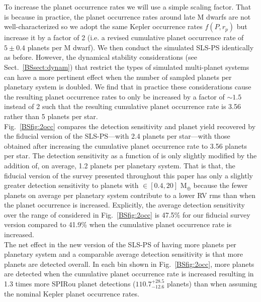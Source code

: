 To increase the planet occurrence rates we will use a simple scaling factor.
That is because in practice, the planet occurrence rates around late M dwarfs are not
well-characterized so we adopt the same Kepler occurrence rates $f(P,r_p)$
but increase it by a factor of 2 (i.e. a revised cumulative planet occurrence
rate of $5 \pm 0.4$ planets per M dwarf). We then conduct the simulated
SLS-PS identically as before. However, the dynamical stability considerations (see 
Sect.~\ref{BSsect:dynam}) that restrict the types of simulated multi-planet systems
can have a more pertinent effect when the number of sampled planets per planetary
system is doubled. We find that in practice these considerations cause the resulting planet
occurrence rates to only be increased by a factor of $\sim 1.5$ instead of 2
such that the resulting cumulative planet occurrence rate is 3.56 rather than 5
planets per star. \\

Fig.~\ref{BSfig:2occ} compares the detection sensitivity and planet yield recovered by the
fiducial version of the SLS-PS---with 2.4 planets per star---with those obtained after increasing
the cumulative planet occurrence rate to 3.56 planets per star. The detection sensitivity as
a function of \msini{} is
only slightly modified by the addition of, on average, 1.2 planets per planetary system.
That is that, the fiducial version of the survey presented throughout this paper
has only a slightly greater detection sensitivity to planets with \msini{} $\in [0.4,20]$ M$_{\oplus}$
because the fewer planets on average per planetary system contribute to a
lower RV rms than when the planet occurrence is increased. Explicitly, the average detection sensitivity
over the range of \msini{} considered in Fig.~\ref{BSfig:2occ} is 47.5\% for our fiducial
survey version compared to 41.9\% when the cumulative planet occurrence rate is increased. \\

The net effect in the new version of the SLS-PS of having more planets per
planetary system and a comparable average detection sensitivity is that more planets are
detected overall. In each \msini{} bin shown in Fig.~\ref{BSfig:2occ}, more planets are detected
when the cumulative planet occurrence rate is increased resulting in
1.3 times more SPIRou planet detections ($110.7^{+28.5}_{-12.6}$ planets) than when assuming the nominal Kepler
planet occurrence rates. \\

